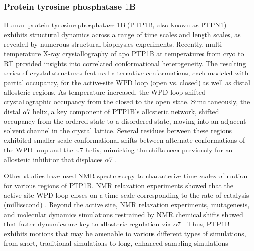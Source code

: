 \documentclass[9pt,review,pubversion]{livecoms}
\begin{document}
\subsubsection{Protein tyrosine phosphatase 1B}
\label{sub2:ptp1b}

Human protein tyrosine phosphatase 1B (PTP1B; also known as PTPN1) exhibits structural dynamics across a range of time scales and length scales, as revealed by numerous structural biophysics experiments.
Recently, multi-temperature X-ray crystallography of apo PTP1B at temperatures from cryo to RT \cite{keedy_expanded_2018} provided insights into correlated conformational heterogeneity.
The resulting series of crystal structures featured alternative conformations, each modeled with partial occupancy, for the active-site WPD loop (open vs. closed) as well as distal allosteric regions.
As temperature increased, the WPD loop shifted crystallographic occupancy from the closed to the open state.
Simultaneously, the distal $\alpha$7 helix, a key component of PTP1B’s allosteric network, shifted occupancy from the ordered state to a disordered state, moving into an adjacent solvent channel in the crystal lattice.
Several residues between these regions exhibited smaller-scale conformational shifts between alternate conformations of the WPD loop and the $\alpha$7 helix, mimicking the shifts seen previously for an allosteric inhibitor that displaces $\alpha$7 \cite{wiesmann_allosteric_2004}.

Other studies have used NMR spectroscopy to characterize time scales of motion for various regions of PTP1B.
NMR relaxation experiments showed that the active-site WPD loop closes on a time scale corresponding to the rate of catalysis (millisecond) \cite{whittier_conformational_2013}.
Beyond the active site, NMR relaxation experiments, mutagenesis, and molecular dynamics simulations restrained by NMR chemical shifts showed that faster dynamics are key to allosteric regulation via $\alpha$7 \cite{choy_conformational_2017}.
Thus, PTP1B exhibits motions that may be amenable to various different types of simulations, from short, traditional simulations to long, enhanced-sampling simulations.
\end{document}
